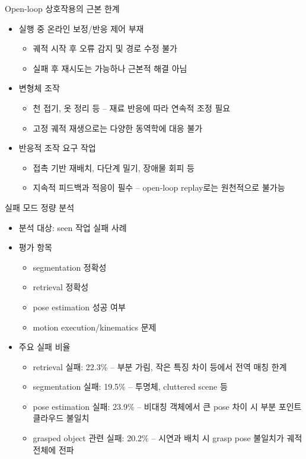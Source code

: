 \documentclass[aspectratio=169]{beamer}
\begin{document}
\begin{frame}{Open-loop 상호작용의 근본 한계}
  \small
  \begin{itemize}
    \item 실행 중 온라인 보정/반응 제어 부재
    \begin{itemize}
      \item 궤적 시작 후 오류 감지 및 경로 수정 불가
      \item 실패 후 재시도는 가능하나 근본적 해결 아님
    \end{itemize}
    \item 변형체 조작
    \begin{itemize}
      \item 천 접기, 옷 정리 등 – 재료 반응에 따라 연속적 조정 필요
      \item 고정 궤적 재생으로는 다양한 동역학에 대응 불가
    \end{itemize}
    \item 반응적 조작 요구 작업
    \begin{itemize}
      \item 접촉 기반 재배치, 다단계 밀기, 장애물 회피 등
      \item 지속적 피드백과 적응이 필수 – open-loop replay로는 원천적으로 불가능
    \end{itemize}
  \end{itemize}
\end{frame}

\begin{frame}{실패 모드 정량 분석}
  \small
  \begin{itemize}
    \item 분석 대상: seen 작업 실패 사례
    \item 평가 항목
    \begin{itemize}
      \item segmentation 정확성
      \item retrieval 정확성
      \item pose estimation 성공 여부
      \item motion execution/kinematics 문제
    \end{itemize}
    \item 주요 실패 비율
    \begin{itemize}
      \item retrieval 실패: 22.3\% – 부분 가림, 작은 특징 차이 등에서 전역 매칭 한계
      \item segmentation 실패: 19.5\% – 투명체, cluttered scene 등
      \item pose estimation 실패: 23.9\% – 비대칭 객체에서 큰 pose 차이 시 부분 포인트 클라우드 불일치
      \item grasped object 관련 실패: 20.2\% – 시연과 배치 시 grasp pose 불일치가 궤적 전체에 전파
    \end{itemize}
  \end{itemize}
\end{frame}
\end{document}
